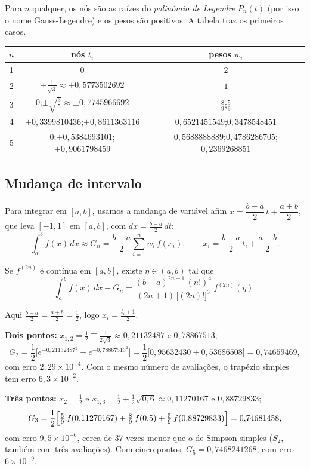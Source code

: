 Para $n$ qualquer, os nós são as raízes do \emph{polinômio de Legendre} $P_n(t)$ (por isso
o nome Gauss-Legendre) e os pesos são positivos. A tabela traz os primeiros casos.
\begin{center}
\renewcommand{\arraystretch}{1.4}
\begin{tabular}{c|c|c}
$n$ & nós $t_i$ & pesos $w_i$\\ \hline
1 & $0$ & $2$\\
2 & $\pm\frac{1}{\sqrt3}\approx\pm0{,}5773502692$ & $1$\\
3 & $0$;\quad $\pm\sqrt{\frac35}\approx\pm0{,}7745966692$ & $\frac89$;\quad $\frac59$\\
4 & $\pm0{,}3399810436$;\quad $\pm0{,}8611363116$ & $0{,}6521451549$;\quad $0{,}3478548451$\\
5 & $0$;\quad $\pm0{,}5384693101$;\quad $\pm0{,}9061798459$ & $0{,}5688888889$;\quad $0{,}4786286705$;\quad $0{,}2369268851$
\end{tabular}
\end{center}

\subsection{Mudança de intervalo}

Para integrar em $[a,b]$, usamos a mudança de variável afim
$x=\dfrac{b-a}{2}\,t+\dfrac{a+b}{2}$, que leva $[-1,1]$ em $[a,b]$, com
$dx=\frac{b-a}{2}\,dt$:
\[
\boxed{\;\int_a^b f(x)\,dx\approx G_n=\frac{b-a}{2}\sum_{i=1}^{n}w_i\,f(x_i),\qquad
x_i=\frac{b-a}{2}\,t_i+\frac{a+b}{2}.\;}
\]

\begin{teorema}
Se $f^{(2n)}$ é contínua em $[a,b]$, existe $\eta\in(a,b)$ tal que
\[
\int_a^b f(x)\,dx-G_n=\frac{(b-a)^{2n+1}\,(n!)^4}{(2n+1)\,\bigl[(2n)!\bigr]^3}\,f^{(2n)}(\eta).
\]
\end{teorema}

\begin{exemplo}
Aqui $\frac{b-a}{2}=\frac{a+b}{2}=\frac12$, logo $x_i=\frac{t_i+1}{2}$.

\textbf{Dois pontos:} $x_{1,2}=\frac12\mp\frac{1}{2\sqrt3}\approx0{,}21132487$ e $0{,}78867513$;
\[
G_2=\frac12\bigl[e^{-0{,}21132487^2}+e^{-0{,}78867513^2}\bigr]
=\frac12\bigl[0{,}95632430+0{,}53686508\bigr]=0{,}74659469,
\]
com erro $2{,}29\times10^{-4}$. Com o mesmo número de avaliações, o trapézio simples tem erro
$6{,}3\times10^{-2}$.

\textbf{Três pontos:} $x_2=\frac12$ e $x_{1,3}=\frac12\mp\frac12\sqrt{0{,}6}\approx0{,}11270167$ e $0{,}88729833$;
\[
G_3=\frac12\Bigl[\tfrac59\,f(0{,}11270167)+\tfrac89\,f(0{,}5)+\tfrac59\,f(0{,}88729833)\Bigr]=0{,}74681458,
\]
com erro $9{,}5\times10^{-6}$, cerca de 37 vezes menor que o de Simpson simples
($S_2$, também com três avaliações). Com cinco pontos, $G_5=0{,}7468241268$, com erro
$6\times10^{-9}$.
\end{exemplo}

